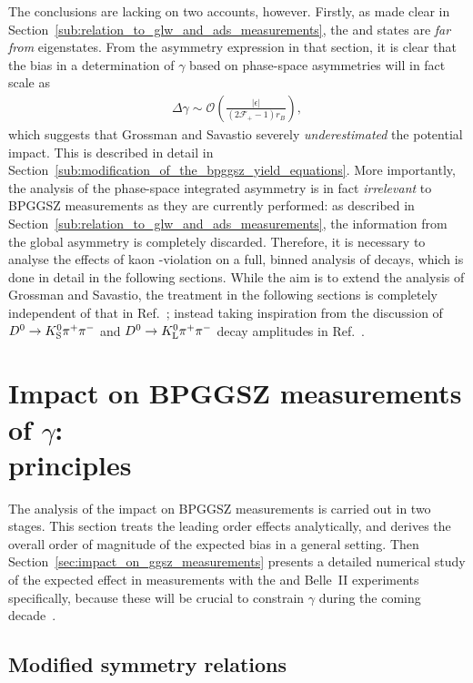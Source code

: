 The conclusions are lacking on two accounts, however. Firstly, as made clear in Section~\ref{sub:relation_to_glw_and_ads_measurements}, the \Kspipi and \KsKK states are \emph{far from} \CP eigenstates. From the asymmetry expression in that section, it is clear that the bias in a determination of $\gamma$ based on phase-space asymmetries will in fact scale as 
\begin{align}
  \Delta \gamma \sim \mathcal O \left(
  \frac{|\epsilon|}
  {(2\mathcal F_+ -1)r_B}
  \right),
\end{align} which suggests that Grossman and Savastio severely \emph{underestimated} the potential impact. This is described in detail in Section~\ref{sub:modification_of_the_bpggsz_yield_equations}. More importantly, the analysis of the phase-space integrated asymmetry is in fact \emph{irrelevant} to BPGGSZ measurements as they are currently performed: as described in Section~\ref{sub:relation_to_glw_and_ads_measurements}, the information from the global asymmetry is completely discarded. Therefore, it is necessary to analyse the effects of kaon \CP-violation on a full, binned analysis of \DtoKshh decays, which is done in detail in the following sections. While the aim is to extend the analysis of Grossman and Savastio, the treatment in the following sections is completely independent of that in Ref.~\cite{grossmanEffectsBarMixing2014}; instead taking inspiration from the discussion of ${{D}^0}\rightarrow{\ensuremath{{K}^0_{\mathrm{S}}}}{\ensuremath{{\pi}^+}}{\ensuremath{{\pi}^-}}$ and ${{D}^0}\rightarrow{\ensuremath{{K}^0_{\mathrm{L}}}}{\ensuremath{{\pi}^+}}{\ensuremath{{\pi}^-}}$ decay amplitudes in Ref.~\cite{CLEOCISI}.

\section{\texorpdfstring{Impact on BPGGSZ measurements of $\gamma$: \\principles}{Impact on BPGGSZ measurements of gamma: principles}}%
\label{sec:impact_on_}

The analysis of the impact on BPGGSZ measurements is carried out in two stages. This section treats the leading order effects analytically, and derives the overall order of magnitude of the expected bias in a general setting. Then Section~\ref{sec:impact_on_ggsz_measurements} presents a detailed numerical study of the expected effect in measurements with the \lhcb and Belle~II experiments specifically, because these will be crucial to constrain $\gamma$ during the coming decade~\cite{kouBelleIIPhysics2019,lhcbcollaborationPhysicsCaseLHCb2019}. 

\subsection{Modified symmetry relations} %
\label{sub:modified_symmetry_relations}

